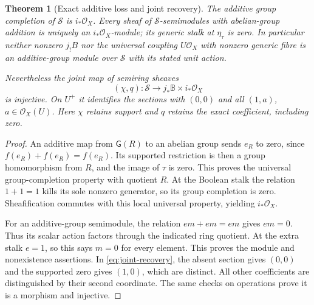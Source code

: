 \documentclass[11pt,a4paper]{article}
\newtheorem{theorem}{Theorem}[section]
\theoremstyle{definition}\newtheorem{definition}[theorem]{Definition}
\newcommand{\G}{\mathsf G}\newcommand{\Tor}{\operatorname{Tor}}\newcommand{\Frac}{\operatorname{Frac}}
\begin{document}
\begin{theorem}[Exact additive loss and joint recovery]
\label{thm:additive-loss}
The additive group completion of $\mathcal S$ is $i_*\mathcal O_X$.
Every sheaf of $\mathcal S$-semimodules with abelian-group addition is
uniquely an $i_*\mathcal O_X$-module; its generic stalk at
$\eta_\tau$ is zero. In particular neither nonzero $j_!B$ nor the
universal coupling $U\mathcal O_X$ with nonzero generic fibre is an
additive-group module over $\mathcal S$ with its stated unit action.

Nevertheless the joint map of semiring sheaves
\[
 (\chi,q):\mathcal S\longrightarrow j_*\mathbb B\times i_*\mathcal O_X
 \tag{RP18}\label{eq:joint-recovery}
\]
is injective. On $U^+$ it identifies the sections with $(0,0)$ and all
$(1,a)$, $a\in\mathcal O_X(U)$. Here $\chi$ retains support and $q$
retains the exact coefficient, including zero.
\end{theorem}
\begin{proof}
An additive map from $\G(R)$ to an abelian group sends $e_R$ to zero,
since $f(e_R)+f(e_R)=f(e_R)$. Its supported restriction is then a
group homomorphism from $R$, and the image of $\tau$ is zero. This
proves the universal group-completion property with quotient $R$.
At the Boolean stalk the relation $1+1=1$ kills its sole nonzero
generator, so its group completion is zero. Sheafification commutes
with this local universal property, yielding $i_*\mathcal O_X$.

For an additive-group semimodule, the relation
$e m+e m=e m$ gives $e m=0$. Thus its scalar action factors through
the indicated ring quotient. At the extra stalk $e=1$, so this says
$m=0$ for every element. This proves the module and nonexistence
assertions. In \eqref{eq:joint-recovery}, the absent section gives
$(0,0)$ and the supported zero gives $(1,0)$, which are distinct.
All other coefficients are distinguished by their second coordinate.
The same checks on operations prove it is a morphism and injective.
\end{proof}
\end{document}

